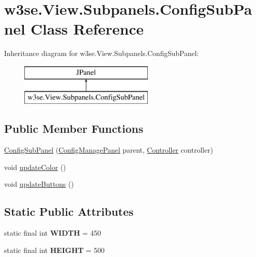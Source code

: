 \hypertarget{classw3se_1_1_view_1_1_subpanels_1_1_config_sub_panel}{\section{w3se.\-View.\-Subpanels.\-Config\-Sub\-Panel Class Reference}
\label{classw3se_1_1_view_1_1_subpanels_1_1_config_sub_panel}
}
Inheritance diagram for w3se.\-View.\-Subpanels.\-Config\-Sub\-Panel\-:\begin{figure}[H]
\begin{center}
\leavevmode
\includegraphics[height=2.000000cm]{classw3se_1_1_view_1_1_subpanels_1_1_config_sub_panel}
\end{center}
\end{figure}
\subsection*{Public Member Functions}
\begin{DoxyCompactItemize}
\item 
\hyperlink{classw3se_1_1_view_1_1_subpanels_1_1_config_sub_panel_ae9ebc54c1f6311f1927a16936572e4d3}{Config\-Sub\-Panel} (\hyperlink{classw3se_1_1_view_1_1_panels_1_1_config_manage_panel}{Config\-Manage\-Panel} parent, \hyperlink{interfacew3se_1_1_controller_1_1_controller}{Controller} controller)
\item 
void \hyperlink{classw3se_1_1_view_1_1_subpanels_1_1_config_sub_panel_a243b9e999d3b6dd6d7fcd6b5e1f963a1}{update\-Color} ()
\item 
void \hyperlink{classw3se_1_1_view_1_1_subpanels_1_1_config_sub_panel_ac9352598ac353adbcf647ce71431d9c0}{update\-Buttons} ()
\end{DoxyCompactItemize}
\subsection*{Static Public Attributes}
\begin{DoxyCompactItemize}
\item 
\hypertarget{classw3se_1_1_view_1_1_subpanels_1_1_config_sub_panel_a719b88022843113c89f44f9a9da8946d}{static final int {\bfseries W\-I\-D\-T\-H} = 450}\label{classw3se_1_1_view_1_1_subpanels_1_1_config_sub_panel_a719b88022843113c89f44f9a9da8946d}

\item 
\hypertarget{classw3se_1_1_view_1_1_subpanels_1_1_config_sub_panel_aad73be9af6d4aec82d6ca23437c09a57}{static final int {\bfseries H\-E\-I\-G\-H\-T} = 500}\label{classw3se_1_1_view_1_1_subpanels_1_1_config_sub_panel_aad73be9af6d4aec82d6ca23437c09a57}

\end{DoxyCompactItemize}



